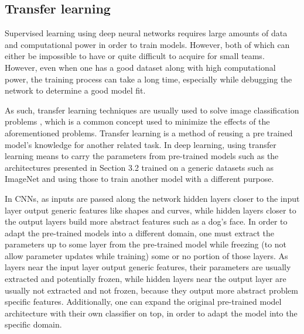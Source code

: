 \documentclass[journal,compsoc]{IEEEtran}
\begin{document}
\subsection{Transfer learning}
Supervised learning using deep neural networks requires large amounts of data and computational power in order to train models. However, both of which can either be impossible to have or quite difficult to acquire for small teams. However, even when one has a good dataset along with high computational power, the training process can take a long time, especially while debugging the network to determine a good model fit. \par
As such, transfer learning techniques are usually used to solve image classification problems \cite{Ly2019}, which is a common concept used to minimize the effects of the aforementioned problems. Transfer learning is a method of reusing a pre trained model's knowledge for another related task\cite{DipanjanSarkarRaghavBali2018}. In deep learning, using transfer learning means to carry the parameters from pre-trained models such as the architectures presented in Section 3.2 trained on a generic datasets such as ImageNet and using those to train another model with a different purpose.\par
In CNNs, as inputs are passed along the network hidden layers closer to the input layer output generic features like shapes and curves, while hidden layers closer to the output layers build more abstract features such as a dog's face. In order to adapt the pre-trained models into a different domain, one must extract the parameters up to some layer from the pre-trained model while freezing (to not allow parameter updates while training) some or no portion of those layers. As layers near the input layer output generic features, their parameters are usually extracted and potentially frozen, while hidden layers near the output layer are usually not extracted and not frozen, because they output more abstract problem specific features. Additionally, one can expand the original pre-trained model architecture with their own classifier on top, in order to adapt the model into the specific domain. \par 
\end{document}
